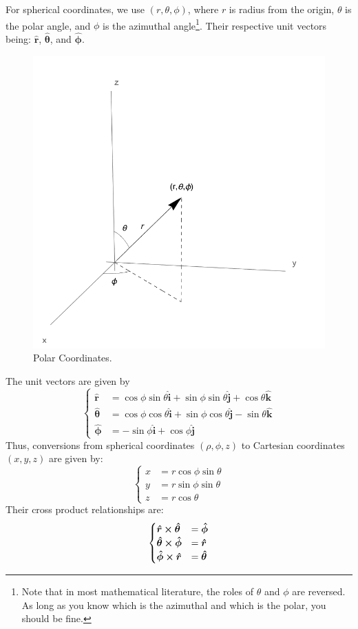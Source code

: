 \documentclass[oneside]{book}
\numberwithin{figure}{section}
\numberwithin{equation}{section}
\newcommand{\bhat}[1]{\bm{\hat{#1}}}
\theoremstyle{definition}
\begin{document}
	For spherical coordinates, we use $ (r, \theta, \phi) $, where $ r $ is radius from the origin, $ \theta $ is the polar angle, and $ \phi $ is the azimuthal angle\footnote{Note that in most mathematical literature, the roles of $ \theta $ and $ \phi $ are reversed. As long as you know which is the azimuthal and which is the polar, you should be fine.}. Their respective unit vectors being: $ \bhat{r} $, $ \bhat{\theta} $, and $ \bhat{\phi} $.
	\begin{figure}[H]
		\centering
		\includegraphics[width=0.6\columnwidth]{Figures/Coordinates/Polar Coordinates.pdf}
		\caption{Polar Coordinates.}
		\label{fig:polar}
	\end{figure}
	The unit vectors are given by
	\begin{equation}
		\begin{cases}
			\bhat{r} &= \cos\phi\sin\theta\bhat{i} + \sin\phi\sin\theta\bhat{j} + \cos\theta\bhat{k}\\
			\bhat{\theta} &= \cos\phi\cos\theta\bhat{i} + \sin\phi\cos\theta\bhat{j} - \sin\theta\bhat{k}\\
			\bhat{\phi} &= -\sin\phi\bhat{i} + \cos\phi\bhat{j}
		\end{cases}
	\end{equation}
	Thus, conversions from spherical coordinates $ (\rho, \phi, z) $ to Cartesian coordinates $ (x,y,z) $ are given by:
	\begin{equation}
		\begin{cases}
			x &= r\cos\phi\sin\theta\\
			y &= r\sin\phi\sin\theta\\
			z &= r\cos\theta
		\end{cases}
	\end{equation}
	Their cross product relationships are:
	\begin{equation}
		\begin{cases}
			\bhat{r} \cross \bhat{\theta} &= \bhat{\phi}\\
			\bhat{\theta} \cross \bhat{\phi} &= \bhat{r}\\
			\bhat{\phi} \cross \bhat{r} &= \bhat{\theta}
		\end{cases}
	\end{equation}
\end{document}
